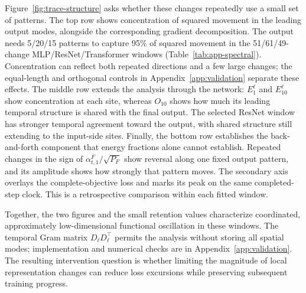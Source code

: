 Figure~\ref{fig:trace-structure} asks whether these changes repeatedly
use a small set of patterns. The top row shows concentration of squared
movement in the leading output modes, alongside the corresponding
gradient decomposition. The output needs 5/20/15 patterns to capture
95\% of squared movement in the 51/61/49-change MLP/ResNet/Transformer
windows (Table~\ref{tab:app-spectral}). Concentration can reflect both repeated
directions and a few large changes; the equal-length and orthogonal
controls in Appendix~\ref{app:validation} separate these effects.
The middle row extends the analysis through the network: $E_1^\ell$
and $E_{10}^\ell$ show concentration at each site, whereas $O_{10}$ shows
how much its leading temporal structure is shared with the final output.
The selected ResNet window has stronger temporal agreement toward the
output, with shared structure still extending to the input-side sites.
Finally, the bottom row establishes the back-and-forth component that
energy fractions alone cannot establish. Repeated changes in the sign
of $\alpha_{t,1}^F/\sqrt{P_F}$ show reversal along one fixed output
pattern, and its amplitude shows how strongly that pattern moves. The
secondary axis overlays the complete-objective loss and marks its peak
on the same completed-step clock. This is a retrospective comparison
within each fitted window.

Together, the two figures and the small retention values characterize
coordinated, approximately low-dimensional functional oscillation in
these windows. The temporal Gram matrix $D_\ell D_\ell^\top$ permits
the analysis without storing all spatial modes; implementation and
numerical checks are in Appendix~\ref{app:validation}. The resulting
intervention question is whether limiting the magnitude of local
representation changes can reduce loss excursions while preserving
subsequent training progress.
